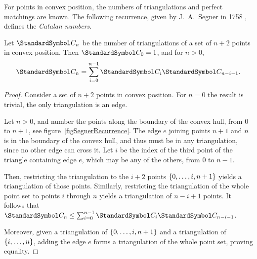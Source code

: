 For points in convex position, the numbers of triangulations and perfect matchings are known.
The following recurrence, given by J.~A.~Segner in 1758 \cite{Segner1758}, defines the \emph{Catalan numbers}.
\begin{theorem}[Segner]
Let $\CatalanNumber n$ be the number of triangulations of a set of $n+2$ points in convex position.
Then $\CatalanNumber 0 = 1$, and for $n>0$, \begin{equation}
\CatalanNumber n = \sum {i=0}[n-1] \CatalanNumber i \CatalanNumber {n-i-1}\text. \label{CatalanRecurrence}
\end{equation}
\begin{proof}
Consider a set of $n+2$ points in convex position.
For $n=0$ the result is trivial, the only triangulation is an edge.

Let $n > 0$, and number the points along the boundary of the convex hull, from $0$ to $n+1$,
see figure~\ref{figSegnerRecurrence}.
The edge $e$ joining points $n+1$ and $n$ is in the boundary of the convex hull, and thus must
be in any triangulation, since no other edge can cross it. Let $i$ be the index of the third point of the
triangle containing edge $e$, which may be any of the others, from $0$ to $n-1$.

Then, restricting the triangulation to the $i+2$ points $\left\lbrace 0,\dotsc,i,n+1\right\rbrace$ yields a triangulation
of those points.
Similarly, restricting the triangulation of the whole point set to points $i$ through $n$ yields a triangulation of
$n-i+1$ points. It follows that $\CatalanNumber n \leq \sum {i=0}[n-1] \CatalanNumber i \CatalanNumber {n-i-1}$.

Moreover, given a triangulation of $\left\lbrace 0,\dotsc,i,n+1\right\rbrace$ and a triangulation of $\left\lbrace i,\dotsc, n\right\rbrace$,
adding the edge $e$ forms a triangulation of the whole point set, proving equality.
\end{proof}
\end{theorem}
